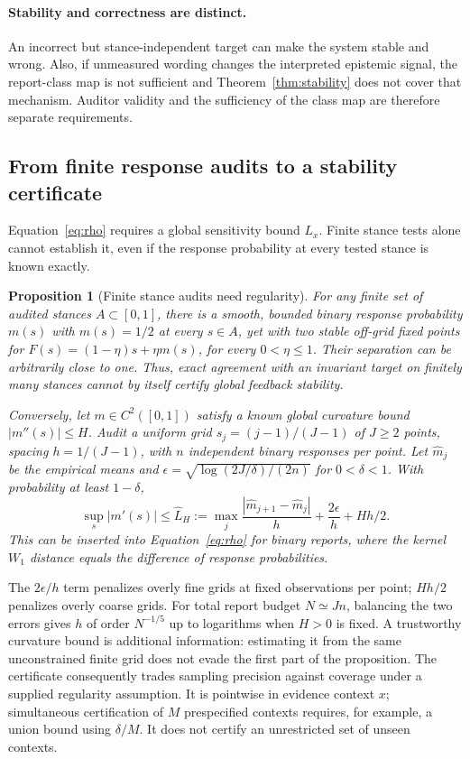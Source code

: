 \documentclass{article}
\newtheorem{proposition}[theorem]{Proposition}
\begin{document}
\paragraph{Stability and correctness are distinct.}
An incorrect but stance-independent target can make the system stable and
wrong. Also, if unmeasured wording changes the interpreted epistemic signal,
the report-class map is not sufficient and Theorem~\ref{thm:stability} does not
cover that mechanism. Auditor validity and the sufficiency of the class
map are therefore separate requirements.

\subsection{From finite response audits to a stability certificate}
Equation~\eqref{eq:rho} requires a global sensitivity bound $L_x$.
Finite stance tests alone cannot establish it, even if the response
probability at every tested stance is known exactly.

\begin{proposition}[Finite stance audits need regularity]
\label{prop:finiteaudit}
For any finite set of audited stances $A\subset[0,1]$, there is a smooth,
bounded binary response probability $m(s)$ with $m(s)=1/2$ at every $s\in A$,
yet with two stable off-grid fixed points for
$F(s)=(1-\eta)s+\eta m(s)$, for every $0<\eta\le1$. Their separation can be
arbitrarily close to one. Thus, exact agreement with an invariant target on
finitely many stances cannot by itself certify global feedback stability.

Conversely, let $m\in C^2([0,1])$ satisfy a known global
curvature bound $|m''(s)|\le H$. Audit a uniform grid $s_j=(j-1)/(J-1)$ of $J\ge2$ points, spacing
$h=1/(J-1)$, with $n$ independent binary responses per point. Let
$\widehat m_j$ be the empirical means and
$\epsilon=\sqrt{\log(2J/\delta)/(2n)}$ for $0<\delta<1$.
With probability at least $1-\delta$,
\begin{equation}
 \sup_s|m'(s)|\le\widehat L_H:=
 \max_j\frac{|\widehat m_{j+1}-\widehat m_j|}{h}
       +\frac{2\epsilon}{h}+Hh/2.
 \label{eq:gridcertificate}
\end{equation}
This can be inserted into Equation~\eqref{eq:rho} for binary reports, where
the kernel $W_1$ distance equals the difference of response probabilities.
\end{proposition}

The $2\epsilon/h$ term penalizes overly fine grids at fixed observations per
point; $Hh/2$ penalizes overly coarse grids. For total report budget $N\simeq Jn$,
balancing the two errors gives $h$ of order $N^{-1/5}$ up to logarithms when
$H>0$ is fixed. A trustworthy curvature bound is additional information:
estimating it from the same unconstrained finite grid does not evade the first
part of the proposition. The certificate consequently trades sampling precision against coverage
under a supplied regularity assumption. It is pointwise in evidence context $x$; simultaneous certification of $M$ prespecified contexts requires, for example, a union bound using $\delta/M$. It does not certify an unrestricted set of unseen contexts.
\end{document}
